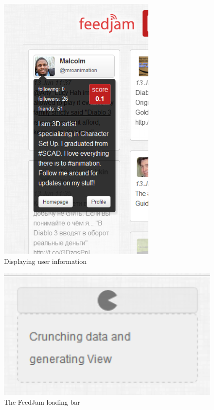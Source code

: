 \begin{figure}[ht]
    \begin{minipage}[b]{1\linewidth}
        \centering
        \includegraphics[width=0.7\textwidth]{figures/feedjam_user_screenshot}
        \caption{Displaying user information}
        \label{fig:feedjamuseropened}
    \end{minipage}
\end{figure}

\begin{figure}[ht]
    \begin{minipage}[b]{1\linewidth}
        \centering
        \includegraphics[width=1\textwidth]{figures/feedjam_loading}
        \caption{The FeedJam loading bar}
        \label{fig:feedjamloading}
    \end{minipage}
\end{figure}

